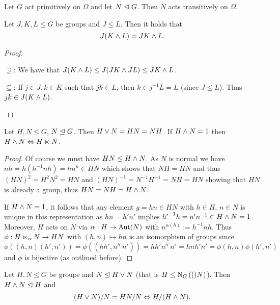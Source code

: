 \documentclass[8pt,a4paper]{article}
\begin{document}
\begin{corollary} Let $G$ act primitively on $\Omega$ and let $N\trianglelefteq G$. Then $N$ acts transitively on $\Omega$.
\end{corollary}



\begin{lemma} Let $J,K,L\leq G$ be groups and $J\leq L$. Then it holds that
    \begin{equation}
        J(K\wedge L)=JK\wedge L.
    \end{equation}
\end{lemma}

\begin{proof}

    \begin{implications}
            \item[$\supseteq$:] We have that $J(K\wedge L)\leq J(JK\wedge JL)\leq JK\wedge L$.
            \item[$\subseteq$:] If $j\in J, k\in K$ such that $jk\in L$, then $k\in j^{-1}L=L$ (since $J\leq L$). Thus
        $jk\in J(K\wedge L)$.
    \end{implications}
\end{proof}

\begin{lemma}
    Let $H,N\leq G$, $N\trianglelefteq G$. Then $H\vee N=HN=NH$.
    If $H\wedge N=1$ then $H\meet N\iso H\leftsemidirprod N$.
\end{lemma}

\begin{proof}
    Of course we must have $HN\leq H\wedge N$.
    As $N$ is normal we have $nh=h(h^{-1}nh)=hn^h\in HN$ which shows that $NH=HN$ and thus $(HN)^2=H^2N^2=HN$ and $(HN)^{-1}=N^{-1}H^{-1}=NH=HN$ showing that $HN$ is already a group, thus $HN=NH=H\wedge N$.

    If $H\wedge N=1$, it follows that any element $g=hn\in HN$ with $h\in H$, $n\in N$ is unique in this representation as $hn=h'n'$ implies ${h'}^{-1}h=n'n^{-1}\in H\wedge N=1$.
    Moreover, $H$ acts on $N$ via $\alpha:H\rightarrow\mathop\mathrm{Aut}\nolimits(N)$ with $n^{\alpha(h)}:=h^{-1}nh$. Thus $\phi:H\leftsemidirprod[\alpha] N\to HN$ with $(h,n)\mapsto hn$ is an isomorphism of groups since $\phi((h,n)(h',n'))=\phi((hh',n^{h'}n'))=hh'n^{h'}n'=hnh'n'=\phi(h,n)\phi(h',n')$ and $\phi$ is bijective (as outlined before).
\end{proof}

\begin{lemma}
    Let $H,N\leq G$ be groups and $N\trianglelefteq H\vee N$ (that is $H\leq \normalisor[G](N)$). Then $H\wedge N\trianglelefteq H$ and
    \begin{equation}
        (H\vee N)/N=HN/N\Leftrightarrow H/(H\wedge N).
    \end{equation}
\end{lemma}
\end{document}
